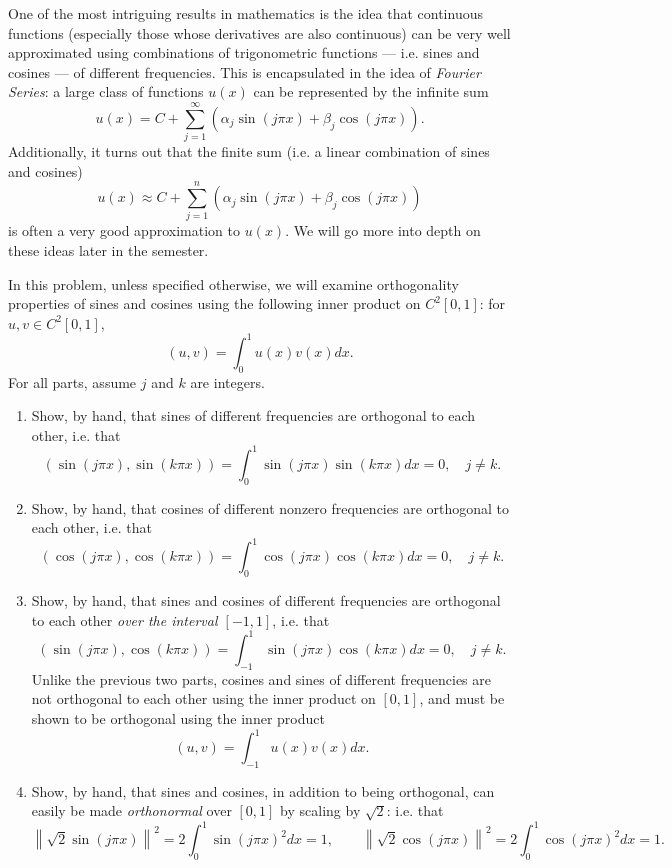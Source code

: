 One of the most intriguing results in mathematics is the idea that continuous functions (especially those whose derivatives are also continuous) can be very well approximated using combinations of trigonometric functions --- i.e. sines and cosines --- of different frequencies.  This is encapsulated in the idea of \emph{Fourier Series}: a large class of functions $u(x)$ can be represented by the infinite sum 
\[
u(x) = C + \sum_{j = 1}^\infty\left( \alpha_j \sin(j\pi x) + \beta_j \cos(j\pi x)\right).
\]
Additionally, it turns out that the finite sum (i.e. a linear combination of sines and cosines)
\[
u(x) \approx C + \sum_{j=1}^n  \left( \alpha_j \sin(j\pi x) + \beta_j \cos(j\pi x)\right)
\]
is often a very good approximation to $u(x)$.  We will go more into depth on these ideas later in the semester.  

In this problem, unless specified otherwise, we will examine orthogonality properties of sines and cosines using the following inner product on $C^2[0,1]$: for $u, v\in C^2[0,1]$, 
\[
(u,v) = \int_0^1 u(x)v(x)dx.
\]
For all parts, assume $j$ and $k$ are integers.

\begin{enumerate}
\item Show, by hand, that sines of different frequencies are orthogonal to each other, i.e. that
\[
\left( \sin( j \pi x), \sin(k \pi x)\right) = \int_0^1 \sin( j \pi x) \sin(k \pi x)dx = 0, \quad j \neq k.
\]
\item Show, by hand, that cosines of different nonzero frequencies are orthogonal to each other, i.e. that
\[
\left( \cos( j \pi x), \cos(k\pi x) \right) = \int_0^1 \cos( j \pi x) \cos(k\pi x)dx = 0, \quad j\neq k.
\]
\item Show, by hand, that sines and cosines of different frequencies are orthogonal to each other \emph{over the interval $[-1,1]$}, i.e. that
\[
\left( \sin( j \pi x), \cos(k\pi x)\right) = \int_{-1}^1 \sin( j \pi x) \cos(k\pi x)dx = 0, \quad j \neq k. 
\]
Unlike the previous two parts, cosines and sines of different frequencies are not orthogonal to each other using the inner product on $[0,1]$, and must be shown to be orthogonal using the inner product
\[
(u,v) = \int_{-1}^1 u(x)v(x)dx.
\]
\item Show, by hand, that sines and cosines, in addition to being orthogonal, can easily be made \emph{orthonormal} over $[0,1]$ by scaling by $\sqrt{2}$: i.e. that
\[
\left\|\sqrt{2}\sin(j\pi x)\right\|^2 = 2\int_0^1 \sin(j\pi x)^2 dx = 1, \qquad \left\|\sqrt{2}\cos(j\pi x)\right\|^2 = 2\int_0^1 \cos(j\pi x)^2 dx = 1.
\]

\end{enumerate}


